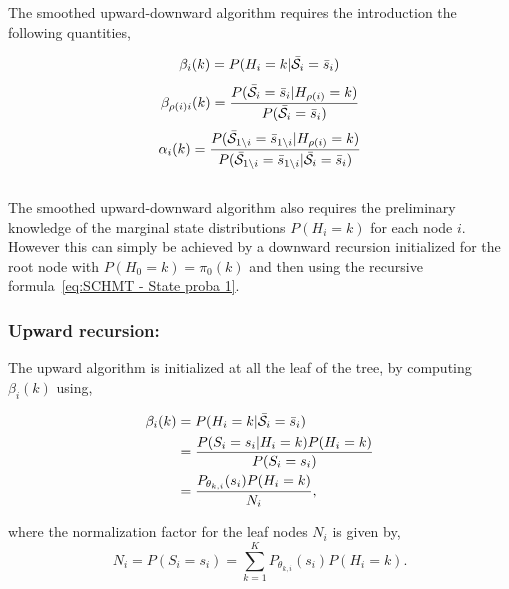 \documentclass[a4paper,11pt]{report}
\begin{document}
{			The smoothed upward-downward algorithm requires the introduction the following quantities,
			
			\begin{equation}
			  \beta_{i}(k) = P(H_{i}=k | \bar{\mathcal{S}}_{i}= \bar{s}_{i})
			  \label{eq:UD beta node}
			\end{equation}
			\begin{equation}
			  \beta_{\rho(i)i}(k) = \frac{P(\bar{\mathcal{S}}_{i}= \bar{s}_{i} | H_{\rho(i)}=k)} {P(\bar{\mathcal{S}}_{i}= \bar{s}_{i}) }
			  \label{eq:UD beta node and parents}
			\end{equation}
						\begin{equation}
			  \alpha_{i}(k) = \frac{P(\bar{\mathcal{S}}_{1\backslash i}= \bar{s}_{1\backslash i} | H_{\rho(i)}=k)} {P(\bar{\mathcal{S}}_{1\backslash i}= \bar{s}_{1\backslash i} | \bar{\mathcal{S}}_{i}= \bar{s}_{i} ) }
			  \label{eq:UD alpha}
			\end{equation}\\
			
			The smoothed upward-downward algorithm also requires the preliminary knowledge  of the marginal state distributions $P(H_{i}=k)$ for each node $i$. However this can simply be achieved by a downward recursion initialized for the root node with $P(H_{0}=k)=\pi_{0}(k)$ and then using the recursive formula~\ref{eq:SCHMT - State proba 1}.
			
			\subsubsection{Upward recursion:}
				The upward algorithm is initialized at all the leaf of the tree, by computing $\beta_{i}(k)$ using,
				
				\begin{equation}
					\begin{split}
						\beta_{i}(k)	&= P(H_{i}=k | \bar{\mathcal{S}}_{i}= \bar{s}_{i})\\
													&= \frac{P(S_{i}= s_{i} | H_{i}=k)P(H_{i}=k)} {P(S_{i}= s_{i})}\\
													&= \frac{P_{\theta_{k,i}}(s_{i}) P(H_{i}=k)} {N_{i}},
						\end{split}
						\label{eq:upward beta leaf}
				\end{equation}
				
				where the normalization factor for the leaf nodes $N_{i}$ is given by,
				\begin{equation}
					N_{i}	= P(S_{i}= s_{i}) = \sum_{k=1}^{K} P_{\theta_{k,i}}(s_{i}) P(H_{i}=k).
					\label{eq:upward normalization leaf}
				\end{equation}
				
}
\end{document}
